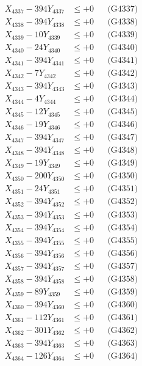 \documentclass[a4paper,10pt]{article}
\begin{document}
{\begin{align}
X_{4337} - 394Y_{4337} &\leq +0 && \text{(G4337)} \\
X_{4338} - 394Y_{4338} &\leq +0 && \text{(G4338)} \\
X_{4339} - 10Y_{4339} &\leq +0 && \text{(G4339)} \\
X_{4340} - 24Y_{4340} &\leq +0 && \text{(G4340)} \\
\allowbreak
X_{4341} - 394Y_{4341} &\leq +0 && \text{(G4341)} \\
X_{4342} - 7Y_{4342} &\leq +0 && \text{(G4342)} \\
X_{4343} - 394Y_{4343} &\leq +0 && \text{(G4343)} \\
X_{4344} - 4Y_{4344} &\leq +0 && \text{(G4344)} \\
X_{4345} - 12Y_{4345} &\leq +0 && \text{(G4345)} \\
X_{4346} - 19Y_{4346} &\leq +0 && \text{(G4346)} \\
X_{4347} - 394Y_{4347} &\leq +0 && \text{(G4347)} \\
X_{4348} - 394Y_{4348} &\leq +0 && \text{(G4348)} \\
X_{4349} - 19Y_{4349} &\leq +0 && \text{(G4349)} \\
X_{4350} - 200Y_{4350} &\leq +0 && \text{(G4350)} \\
\allowbreak
X_{4351} - 24Y_{4351} &\leq +0 && \text{(G4351)} \\
X_{4352} - 394Y_{4352} &\leq +0 && \text{(G4352)} \\
X_{4353} - 394Y_{4353} &\leq +0 && \text{(G4353)} \\
X_{4354} - 394Y_{4354} &\leq +0 && \text{(G4354)} \\
X_{4355} - 394Y_{4355} &\leq +0 && \text{(G4355)} \\
X_{4356} - 394Y_{4356} &\leq +0 && \text{(G4356)} \\
X_{4357} - 394Y_{4357} &\leq +0 && \text{(G4357)} \\
X_{4358} - 394Y_{4358} &\leq +0 && \text{(G4358)} \\
X_{4359} - 89Y_{4359} &\leq +0 && \text{(G4359)} \\
X_{4360} - 394Y_{4360} &\leq +0 && \text{(G4360)} \\
\allowbreak
X_{4361} - 112Y_{4361} &\leq +0 && \text{(G4361)} \\
X_{4362} - 301Y_{4362} &\leq +0 && \text{(G4362)} \\
X_{4363} - 394Y_{4363} &\leq +0 && \text{(G4363)} \\
X_{4364} - 126Y_{4364} &\leq +0 && \text{(G4364)} \\

\end{align}}
\end{document}
